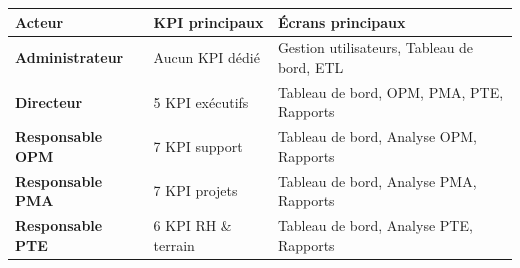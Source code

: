 \documentclass[a4paper,12pt]{article}
\begin{document}
\begin{center}
\begin{tabular}{>{\bfseries}p{4cm} p{4.5cm} p{5.5cm}}
\toprule
Acteur & KPI principaux & Écrans principaux \\
\midrule
Administrateur       & Aucun KPI dédié           & Gestion utilisateurs, Tableau de bord, ETL \\
Directeur            & 5 KPI exécutifs           & Tableau de bord, OPM, PMA, PTE, Rapports \\
Responsable OPM      & 7 KPI support             & Tableau de bord, Analyse OPM, Rapports \\
Responsable PMA      & 7 KPI projets             & Tableau de bord, Analyse PMA, Rapports \\
Responsable PTE      & 6 KPI RH \& terrain       & Tableau de bord, Analyse PTE, Rapports \\
\bottomrule
\end{tabular}
\end{center}
\end{document}
